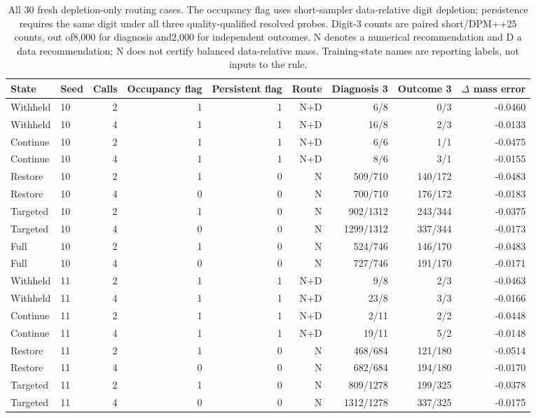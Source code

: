 \begin{table}[t]\centering\small
\setlength{\tabcolsep}{4pt}
\caption{All 30 fresh depletion-only routing cases. The occupancy flag uses short-sampler data-relative digit depletion; persistence requires the same digit under all three quality-qualified resolved probes. Digit-3 counts are paired short/DPM++25 counts, out of8,000 for diagnosis and2,000 for independent outcomes. N denotes a numerical recommendation and D a data recommendation; N does not certify balanced data-relative mass. Training-state names are reporting labels, not inputs to the rule.}
\label{tab:mnist_all_routes}
\begin{tabular}{llrrrrrrr}\toprule
State & Seed & Calls & Occupancy flag & Persistent flag & Route & Diagnosis 3 & Outcome 3 & $\Delta$ mass error \\\midrule
Withheld & 10 & 2 & 1 & 1 & N+D & 6/8 & 0/3 & -0.0460 \\
Withheld & 10 & 4 & 1 & 1 & N+D & 16/8 & 2/3 & -0.0133 \\
Continue & 10 & 2 & 1 & 1 & N+D & 6/6 & 1/1 & -0.0475 \\
Continue & 10 & 4 & 1 & 1 & N+D & 8/6 & 3/1 & -0.0155 \\
Restore & 10 & 2 & 1 & 0 & N & 509/710 & 140/172 & -0.0483 \\
Restore & 10 & 4 & 0 & 0 & N & 700/710 & 176/172 & -0.0183 \\
Targeted & 10 & 2 & 1 & 0 & N & 902/1312 & 243/344 & -0.0375 \\
Targeted & 10 & 4 & 0 & 0 & N & 1299/1312 & 337/344 & -0.0173 \\
Full & 10 & 2 & 1 & 0 & N & 524/746 & 146/170 & -0.0483 \\
Full & 10 & 4 & 0 & 0 & N & 727/746 & 191/170 & -0.0171 \\
Withheld & 11 & 2 & 1 & 1 & N+D & 9/8 & 2/3 & -0.0463 \\
Withheld & 11 & 4 & 1 & 1 & N+D & 23/8 & 3/3 & -0.0166 \\
Continue & 11 & 2 & 1 & 1 & N+D & 2/11 & 2/2 & -0.0448 \\
Continue & 11 & 4 & 1 & 1 & N+D & 19/11 & 5/2 & -0.0148 \\
Restore & 11 & 2 & 1 & 0 & N & 468/684 & 121/180 & -0.0514 \\
Restore & 11 & 4 & 0 & 0 & N & 682/684 & 194/180 & -0.0170 \\
Targeted & 11 & 2 & 1 & 0 & N & 809/1278 & 199/325 & -0.0378 \\
Targeted & 11 & 4 & 0 & 0 & N & 1312/1278 & 337/325 & -0.0175 \\

\end{tabular}
\end{table}
